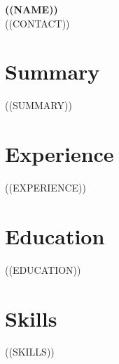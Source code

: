 \documentclass[10.5pt,a4paper]{article}
\begin{document}
{\Large\bfseries ((NAME))}\\[2pt]
{\small ((CONTACT))}
\vspace{2pt}

\section*{Summary}
\vspace{2pt}
((SUMMARY))

\section*{Experience}
\vspace{2pt}
((EXPERIENCE))

\section*{Education}
\vspace{2pt}
((EDUCATION))

\section*{Skills}
\vspace{2pt}
((SKILLS))
\end{document}
